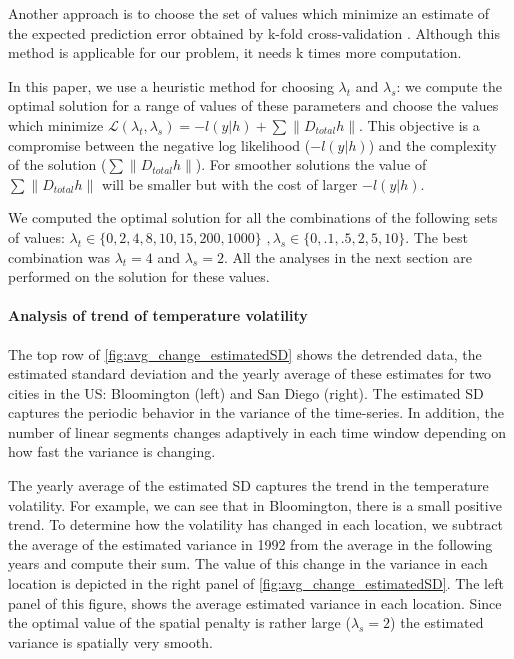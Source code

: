 \documentclass{article}
\begin{document}
Another approach is to choose the set of values which minimize an
estimate of the expected prediction error obtained by k-fold
cross-validation \citep{tibshirani_regression_1996} . Although this
method is applicable for our problem, it needs k times more
computation. 

In this paper, we use a heuristic method for choosing $\lambda_t$ and
$\lambda_s$: we compute the optimal solution for a range of values of
these parameters and choose the values which minimize
$\mathscr{L}(\lambda_t,\lambda_s)=-l(y|h)+ \sum \lVert D_{total}h
\lVert$. This objective is a compromise between the negative log
likelihood ($-l(y|h)$) and the complexity of the solution ($\sum
\lVert D_{total}h \lVert$). For smoother solutions the value of $\sum
\lVert D_{total}h \lVert$ will be smaller but with the cost of larger
$-l(y|h)$. 

We computed the optimal solution for all the combinations of the
following sets of values: $\lambda_t \in \{0,2,4,8,10,15,200,1000\} \, \, ,
\lambda_s \in \{0,.1,.5,2,5,10\}$. The best combination was $\lambda_t=4$ and $\lambda_s=2$. All the analyses in the next section are performed on the solution for these values. 


\paragraph{Analysis of trend of temperature volatility}

The top row of \autoref{fig:avg_change_estimatedSD} shows the
detrended data, the estimated standard deviation and the yearly
average of these estimates for two cities in the US: Bloomington (left) and San Diego (right). The estimated SD captures the periodic behavior in the variance of the time-series. In addition, the number of linear segments changes adaptively in each time window depending on how fast the variance is changing.  

The yearly average of the estimated SD captures the trend in the
temperature volatility. For example, we can see that in Bloomington,
there is a small positive trend. To determine how the volatility has
changed in each location, we subtract the average of the estimated
variance in 1992 from the average in the following years and compute
their sum. The value of this change in the variance in each location
is depicted in the right panel of \autoref{fig:avg_change_estimatedSD}. The left panel of this figure, shows the average estimated variance in each location. Since the optimal value of the spatial penalty is rather large ($\lambda_s=2$) the estimated variance is spatially very smooth.
\end{document}
